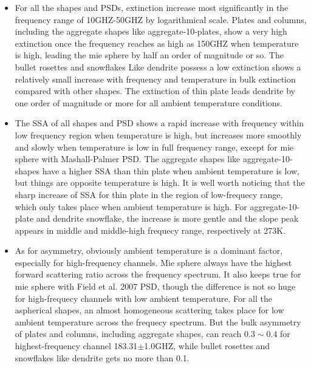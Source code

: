 \documentclass[a4paper]{report}
\begin{document}
\begin{itemize}
    \item {} 
    
    For all the shapes and PSDs, extinction increase most significantly in the frequency range of 10GHZ-50GHZ by logarithmical scale.
    Plates and columns, including the aggregate shapes like aggregate-10-plates, show a very high extinction once the frequency reaches as high
    as 150GHZ when temperature is high, leading the mie sphere by half an order of magnitude or so. The bullet rosettes and snowflakes Like
    dendrite possess a low extinction shows a relatively small increase with frequency and temperature in bulk extinction compared with other shapes.
    The extinction of thin plate leads dendrite by one order of magnitude or more for all ambient temperature conditions.  

    \item {}
     
    The SSA of all shapes and PSD shows a rapid increase with frequency within low frequency region when temperature is high, 
    but increases more smoothly and slowly when temperature is low in full frequency range, except for mie sphere with Mashall-Palmer PSD. 
    The aggregate shapes like aggregate-10-shapes have a higher SSA than thin plate when ambient temperature is low, but things are opposite temperature is high.
    It is well worth noticing that the sharp increase of SSA for thin plate in the region of low-frequecy range, which only takes place when ambient temperature is high.
    For aggregate-10-plate and dendrite snowflake, the increase is more gentle and the slope peak appears in middle and middle-high frequecy range, respectively at 273K.  
    
    \item {}
    
    As for asymmetry, obviously ambient temperature is a dominant factor, especially for high-frequency channels. Mie sphere always have the highest forward scattering ratio
    across the frequency spectrum. It also keeps true for mie sphere with Field et al. 2007 PSD, though the difference is not so huge for high-frequecy channels with low ambient
    temperature. For all the aspherical shapes, an almost homogeneous scattering takes place for low ambient temperature across the frequecy spectrum. But the bulk asymmetry
    of plates and columns, including aggregate shapes, can reach $0.3 \sim 0.4$ for highest-frequency channel 183.31$\pm$1.0GHZ, while bullet rosettes and snowflakes like dendrite
    gets no more than 0.1.
    
\end{itemize}
\end{document}

